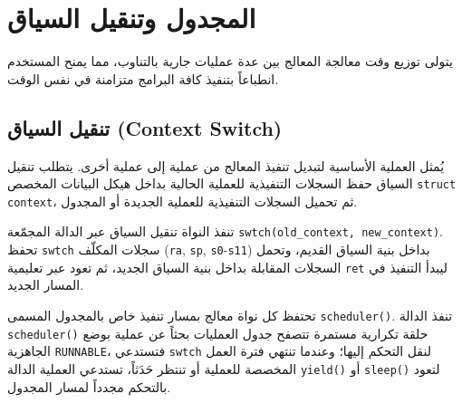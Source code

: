 \chapter{المجدول وتنقيل السياق}
\label{chap:sched}

يتولى  توزيع وقت معالجة المعالج بين عدة عمليات جارية بالتناوب،
مما يمنح المستخدم انطباعاً بتنفيذ كافة البرامج متزامنة في نفس الوقت.

\section{تنقيل السياق (Context Switch)}

يُمثل  العملية الأساسية لتبديل تنفيذ المعالج من عملية إلى عملية أخرى.
يتطلب تنقيل السياق حفظ السجلات التنفيذية للعملية الحالية بداخل هيكل البيانات المخصص \texttt{struct context}،
ثم تحميل السجلات التنفيذية للعملية الجديدة أو المجدول.

تنفذ النواة تنقيل السياق عبر الدالة المجمّعة \texttt{swtch(old_context, new_context)}.
تحفظ \texttt{swtch} سجلات المكلّف (\texttt{ra}, \texttt{sp}, \texttt{s0}-\texttt{s11}) بداخل بنية السياق القديم،
وتحمل السجلات المقابلة بداخل بنية السياق الجديد، ثم تعود عبر تعليمية \texttt{ret} ليبدأ التنفيذ في المسار الجديد.

تحتفظ كل نواة معالج بمسار تنفيذ خاص بالمجدول المسمى \texttt{scheduler()}.
تنفذ الدالة \texttt{scheduler()} حلقة تكرارية مستمرة تتصفح جدول العمليات بحثاً عن عملية بوضع الجاهزية \texttt{RUNNABLE}،
فتستدعي \texttt{swtch} لنقل التحكم إليها؛ وعندما تنتهي فترة العمل المخصصة للعملية أو تنتظر حَدَثاً، تستدعي العملية الدالة \texttt{yield()} أو \texttt{sleep()} لتعود بالتحكم مجدداً لمسار المجدول.
